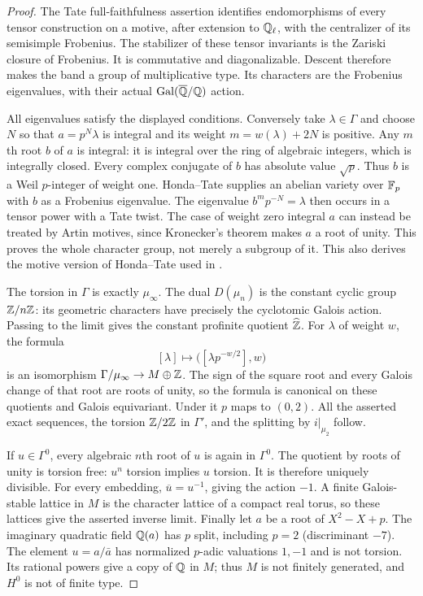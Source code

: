 \begin{proof}
The Tate full-faithfulness assertion identifies endomorphisms of every
tensor construction on a motive, after extension to $\mathbb Q_\ell$, with
the centralizer of its semisimple Frobenius. The stabilizer of these
tensor invariants is the Zariski closure of Frobenius. It is
commutative and diagonalizable. Descent therefore makes the band a
group of multiplicative type. Its characters are the Frobenius
eigenvalues, with their actual $\operatorname{Gal}(\overline{\mathbb Q}/\mathbb Q)$ action.

All eigenvalues satisfy the displayed conditions. Conversely take
$\lambda\in\Gamma$ and choose $N$ so that $a=p^N\lambda$ is integral
and its weight $m=w(\lambda)+2N$ is positive. Any $m$th root $b$ of
$a$ is integral: it is integral over the ring of algebraic integers,
which is integrally closed. Every complex conjugate of $b$ has
absolute value $\sqrt p$. Thus $b$ is a Weil $p$-integer of weight
one. Honda--Tate supplies an abelian variety over $\mathbb F_p$ with $b$
as a Frobenius eigenvalue. The eigenvalue $b^m p^{-N}=\lambda$
then occurs in a tensor power with a Tate twist. The case of weight
zero integral $a$ can instead be treated by Artin motives, since
Kronecker's theorem makes $a$ a root of unity. This proves the whole
character group, not merely a subgroup of it. This also derives the
motive version of Honda--Tate used in
\citet[Proposition 2.6 and Remark 2.7]{AMilne1994}.

The torsion in $\Gamma$ is exactly $\mu_\infty$. The dual
$D(\mu_n)$ is the constant cyclic group $\mathbb Z/n\mathbb Z$: its geometric
characters have precisely the cyclotomic Galois action. Passing to
the limit gives the constant profinite quotient $\widehat{\mathbb Z}$.
For $\lambda$ of weight $w$, the formula
\[
 [\lambda]\longmapsto
 \bigl([\lambda p^{-w/2}],w\bigr)
\]
is an isomorphism $\Gamma/\mu_\infty\to M\oplus\mathbb Z$.
The sign of the square root and every Galois change of that root
are roots of unity, so the formula is canonical on these quotients
and Galois equivariant. Under it $p$ maps to $(0,2)$.
All the asserted exact sequences, the torsion $\mathbb Z/2\mathbb Z$ in
$\Gamma'$, and the splitting by $i|_{\mu_2}$ follow.

If $u\in\Gamma^0$, every algebraic $n$th root of $u$ is again
in $\Gamma^0$. The quotient by roots of unity is torsion free:
$u^n$ torsion implies $u$ torsion. It is therefore uniquely divisible.
For every embedding, $\overline{u}=u^{-1}$, giving the action $-1$.
A finite Galois-stable lattice in $M$ is the character lattice of a
compact real torus, so these lattices give the asserted inverse limit.
Finally let $a$ be a root of $X^2-X+p$. The imaginary quadratic field
$\mathbb Q(a)$ has $p$ split, including $p=2$ (discriminant $-7$).
The element $u=a/\bar a$ has normalized $p$-adic valuations $1,-1$
and is not torsion. Its rational powers give a copy of $\mathbb Q$ in $M$;
thus $M$ is not finitely generated, and $H^0$ is not of finite type.
\end{proof}

